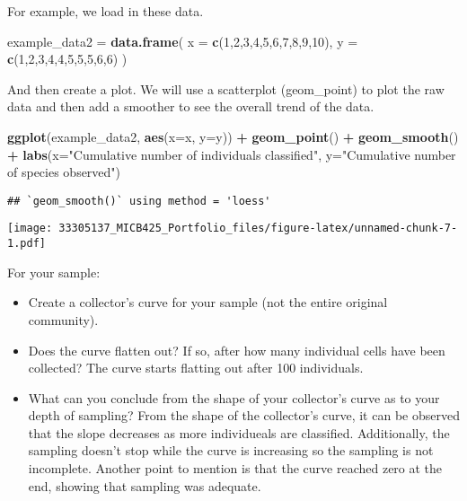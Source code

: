 \documentclass[]{article}
\newenvironment{Shaded}{\begin{snugshade}}{\end{snugshade}}
\newcommand{\KeywordTok}[1]{\textcolor[rgb]{0.13,0.29,0.53}{\textbf{#1}}}
\newcommand{\DataTypeTok}[1]{\textcolor[rgb]{0.13,0.29,0.53}{#1}}
\newcommand{\DecValTok}[1]{\textcolor[rgb]{0.00,0.00,0.81}{#1}}
\newcommand{\StringTok}[1]{\textcolor[rgb]{0.31,0.60,0.02}{#1}}
\newcommand{\OperatorTok}[1]{\textcolor[rgb]{0.81,0.36,0.00}{\textbf{#1}}}
\newcommand{\NormalTok}[1]{#1}
\providecommand{\tightlist}{%
  \setlength{\itemsep}{0pt}\setlength{\parskip}{0pt}}
\begin{document}
For example, we load in these data.

\begin{Shaded}
\begin{Highlighting}[]
\NormalTok{example_data2 =}\StringTok{ }\KeywordTok{data.frame}\NormalTok{(}
  \DataTypeTok{x =} \KeywordTok{c}\NormalTok{(}\DecValTok{1}\NormalTok{,}\DecValTok{2}\NormalTok{,}\DecValTok{3}\NormalTok{,}\DecValTok{4}\NormalTok{,}\DecValTok{5}\NormalTok{,}\DecValTok{6}\NormalTok{,}\DecValTok{7}\NormalTok{,}\DecValTok{8}\NormalTok{,}\DecValTok{9}\NormalTok{,}\DecValTok{10}\NormalTok{),}
  \DataTypeTok{y =} \KeywordTok{c}\NormalTok{(}\DecValTok{1}\NormalTok{,}\DecValTok{2}\NormalTok{,}\DecValTok{3}\NormalTok{,}\DecValTok{4}\NormalTok{,}\DecValTok{4}\NormalTok{,}\DecValTok{5}\NormalTok{,}\DecValTok{5}\NormalTok{,}\DecValTok{5}\NormalTok{,}\DecValTok{6}\NormalTok{,}\DecValTok{6}\NormalTok{)}
\NormalTok{)}
\end{Highlighting}
\end{Shaded}

And then create a plot. We will use a scatterplot (geom\_point) to plot
the raw data and then add a smoother to see the overall trend of the
data.

\begin{Shaded}
\begin{Highlighting}[]
\KeywordTok{ggplot}\NormalTok{(example_data2, }\KeywordTok{aes}\NormalTok{(}\DataTypeTok{x=}\NormalTok{x, }\DataTypeTok{y=}\NormalTok{y)) }\OperatorTok{+}
\StringTok{  }\KeywordTok{geom_point}\NormalTok{() }\OperatorTok{+}
\StringTok{  }\KeywordTok{geom_smooth}\NormalTok{() }\OperatorTok{+}
\StringTok{  }\KeywordTok{labs}\NormalTok{(}\DataTypeTok{x=}\StringTok{"Cumulative number of individuals classified"}\NormalTok{, }\DataTypeTok{y=}\StringTok{"Cumulative number of species observed"}\NormalTok{)}
\end{Highlighting}
\end{Shaded}

\begin{verbatim}
## `geom_smooth()` using method = 'loess'
\end{verbatim}

\texttt{[image: 33305137\_MICB425\_Portfolio\_files/figure-latex/unnamed-chunk-7-1.pdf]}

For your sample:

\begin{itemize}
\tightlist
\item
  Create a collector's curve for your sample (not the entire original
  community).
\item
  Does the curve flatten out? If so, after how many individual cells
  have been collected? The curve starts flatting out after 100
  individuals.
\item
  What can you conclude from the shape of your collector's curve as to
  your depth of sampling? From the shape of the collector's curve, it
  can be observed that the slope decreases as more individueals are
  classified. Additionally, the sampling doesn't stop while the curve is
  increasing so the sampling is not incomplete. Another point to mention
  is that the curve reached zero at the end, showing that sampling was
  adequate.
\end{itemize}
\end{document}
